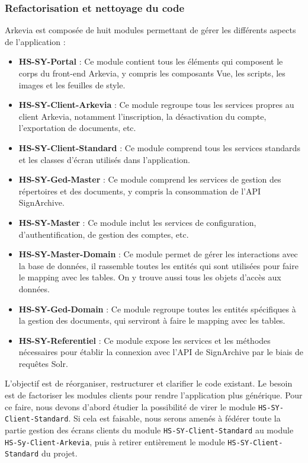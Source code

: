 \subsubsection{Refactorisation et nettoyage du code}
Arkevia est composée de huit modules permettant de gérer les différents aspects de l'application :
\begin{itemize}
    \item \textbf{HS-SY-Portal} :
    Ce module contient tous les éléments qui composent le corps du front-end Arkevia, y compris les composants Vue, les scripts, les images et les feuilles de style.
    \item \textbf{HS-SY-Client-Arkevia} :
    Ce module regroupe tous les services propres au client Arkevia, notamment l'inscription, la désactivation du compte, l'exportation de documents, etc.
    \item \textbf{HS-SY-Client-Standard} :
    Ce module comprend tous les services standards et les classes d'écran utilisés dans l'application.
    \item \textbf{HS-SY-Ged-Master} :
    Ce module comprend les services de gestion des répertoires et des documents, y compris la consommation de l'API SignArchive.
    \item \textbf{HS-SY-Master} : Ce module inclut les services de configuration, d'authentification, de gestion des comptes, etc.
    \item \textbf{HS-SY-Master-Domain} : Ce module permet de gérer les interactions avec la base de données, il rassemble toutes les entités qui sont utilisées pour faire le mapping avec les tables. On y trouve aussi tous les objets d'accès aux données.
    \item \textbf{HS-SY-Ged-Domain} : Ce module regroupe toutes les entités spécifiques à la gestion des documents, qui serviront à faire le mapping avec les tables.
    \item \textbf{HS-SY-Referentiel} : Ce module expose les services et les méthodes nécessaires pour établir la connexion avec l'API de SignArchive par le biais de requêtes Solr.\\
\end{itemize}

L'objectif est de réorganiser, restructurer et clarifier le code existant. Le besoin est de factoriser les modules clients pour rendre l'application plus générique. Pour ce faire, nous devons d'abord étudier la possibilité de virer le module \lstinline|HS-SY-Client-Standard|. Si cela est faisable, nous serons amenés à fédérer toute la partie gestion des écrans clients du module \lstinline|HS-SY-Client-Standard| au module \lstinline|HS-Sy-Client-Arkevia|, puis à retirer entièrement le module \lstinline|HS-SY-Client-Standard| du projet.\\

